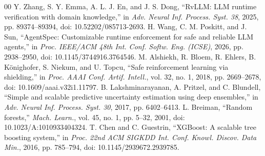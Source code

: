 \documentclass[conference]{IEEEtran}
\begin{document}
\begin{thebibliography}{00}
 Y. Zhang, S. Y. Emma, A. L. J. En, and J. S. Dong, ``RvLLM: LLM runtime verification with domain knowledge,'' in \textit{Adv. Neural Inf. Process. Syst. 38}, 2025, pp. 89374--89394, doi: 10.52202/085713-2693.
 H. Wang, C. M. Poskitt, and J. Sun, ``AgentSpec: Customizable runtime enforcement for safe and reliable LLM agents,'' in \textit{Proc. IEEE/ACM 48th Int. Conf. Softw. Eng. (ICSE)}, 2026, pp. 2938--2950, doi: 10.1145/3744916.3764546.
 M. Alshiekh, R. Bloem, R. Ehlers, B. K\"{o}nighofer, S. Niekum, and U. Topcu, ``Safe reinforcement learning via shielding,'' in \textit{Proc. AAAI Conf. Artif. Intell.}, vol. 32, no. 1, 2018, pp. 2669--2678, doi: 10.1609/aaai.v32i1.11797.
 B. Lakshminarayanan, A. Pritzel, and C. Blundell, ``Simple and scalable predictive uncertainty estimation using deep ensembles,'' in \textit{Adv. Neural Inf. Process. Syst. 30}, 2017, pp. 6402--6413.
 L. Breiman, ``Random forests,'' \textit{Mach. Learn.}, vol. 45, no. 1, pp. 5--32, 2001, doi: 10.1023/A:1010933404324.
 T. Chen and C. Guestrin, ``XGBoost: A scalable tree boosting system,'' in \textit{Proc. 22nd ACM SIGKDD Int. Conf. Knowl. Discov. Data Min.}, 2016, pp. 785--794, doi: 10.1145/2939672.2939785.
\end{thebibliography}
\end{document}
